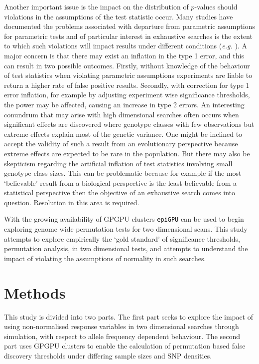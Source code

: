 Another important issue is the impact on the distribution of $p$-values should violations in the assumptions of the test statistic occur. Many studies have documented the problems associated with departure from parametric assumptions for parametric tests and of particular interest in exhaustive searches is the extent to which such violations will impact results under different conditions (\emph{e.g.} \cite{Boneau1960, Sawilowsky1992, Cribbie2003}). A major concern is that there may exist an inflation in the type 1 error, and this can result in two possible outcomes. Firstly, without knowledge of the behaviour of test statistics when violating parametric assumptions experiments are liable to return a higher rate of false positive results. Secondly, with correction for type 1 error inflation, for example by adjusting experiment wise significance thresholds, the power may be affected, causing an increase in type 2 errors. An interesting conundrum that may arise with high dimensional searches often occurs when significant effects are discovered where genotype classes with few observations but extreme effects explain most of the genetic variance. One might be inclined to accept the validity of such a result from an evolutionary perspective because extreme effects are expected to be rare in the population. But there may also be skepticism regarding the artificial inflation of test statistics involving small genotype class sizes. This can be problematic because for example if the most `believable' 
result from a biological perspective is the least believable from a statistical perspective then the objective of an exhaustive search comes into question. Resolution in this area is required.

With the growing availability of GPGPU clusters {\tt epiGPU} can be used to begin exploring genome wide permutation tests for two dimensional scans. This study attempts to explore empirically the `gold standard' of significance thresholds, permutation analysis, in two dimensional tests, and attempts to understand the impact of violating the assumptions of normality in such searches.

\section{Methods}

This study is divided into two parts. The first part seeks to explore the impact of using non-normalised response variables in two dimensional searches through simulation, with respect to allele frequency dependent behaviour. The second part uses GPGPU clusters to enable the calculation of permutation based false discovery thresholds under differing sample sizes and SNP densities.

